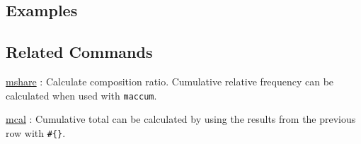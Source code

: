 \subsection*{Examples}


\subsection*{Related Commands}
\hyperref[sect:mshare]{mshare} : Calculate composition ratio. Cumulative relative frequency can be calculated when used with \verb|maccum|.

\hyperref[sect:mcal]{mcal} : Cumulative total can be calculated by using the results from the previous row with \verb|#{}|.

%
